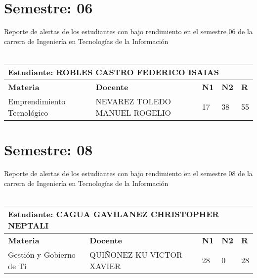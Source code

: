 \section{Semestre: 06}
        Reporte de alertas de los estudiantes con bajo rendimiento en el semestre 06 de la carrera de 
        Ingeniería en Tecnologías de la Información\\\\\small
\begin{tabularx}{\textwidth}{|p{5cm}|p{7cm}|X|X|X|}
\hline
\multicolumn{5}{|p{\dimexpr\textwidth-2\tabcolsep-2\arrayrulewidth}|}{\textbf{Estudiante: ROBLES CASTRO FEDERICO ISAIAS }}\\\hline
\textbf{Materia} & \textbf{Docente} & \textbf{N1} & \textbf{N2} & \textbf{R} \\ \hline
Emprendimiento Tecnológico & NEVAREZ TOLEDO MANUEL ROGELIO  & 17 & 38& 55 \\ \hline
\end{tabularx}\vspace{10mm}
\section{Semestre: 08}
        Reporte de alertas de los estudiantes con bajo rendimiento en el semestre 08 de la carrera de 
        Ingeniería en Tecnologías de la Información\\\\\small
\begin{tabularx}{\textwidth}{|p{5cm}|p{7cm}|X|X|X|}
\hline
\multicolumn{5}{|p{\dimexpr\textwidth-2\tabcolsep-2\arrayrulewidth}|}{\textbf{Estudiante: CAGUA GAVILANEZ CHRISTOPHER NEPTALI }}\\\hline
\textbf{Materia} & \textbf{Docente} & \textbf{N1} & \textbf{N2} & \textbf{R} \\ \hline
Gestión y Gobierno de Ti & QUIÑONEZ KU VICTOR XAVIER  & 28 & 0& 28 \\ \hline
\end{tabularx}\vspace{10mm}
